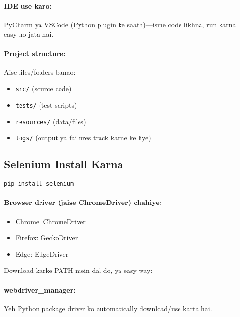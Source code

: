 \documentclass[a4paper,12pt]{article}
\begin{document}
\paragraph{IDE use karo:}
PyCharm ya VSCode (Python plugin ke saath)—isme code likhna, run karna easy ho jata hai.

\paragraph{Project structure:}
Aise files/folders banao:
\begin{itemize}[leftmargin=*]
  \item \texttt{src/} (source code)
  \item \texttt{tests/} (test scripts)
  \item \texttt{resources/} (data/files)
  \item \texttt{logs/} (output ya failures track karne ke liye)
\end{itemize}

\subsection{Selenium Install Karna}

\begin{tcolorbox}[colback=codebg, colframe=black!20, boxrule=0.5pt, sharp corners, title={Install Selenium}]
\begin{lstlisting}[language=BashShell]
pip install selenium
\end{lstlisting}
\end{tcolorbox}

\paragraph{Browser driver (jaise ChromeDriver) chahiye:}

\begin{itemize}[leftmargin=*]
  \item Chrome: ChromeDriver
  \item Firefox: GeckoDriver
  \item Edge: EdgeDriver
\end{itemize}

Download karke PATH mein dal do, ya easy way:

\paragraph{webdriver\_manager:} Yeh Python package driver ko automatically download/use karta hai.
\end{document}
